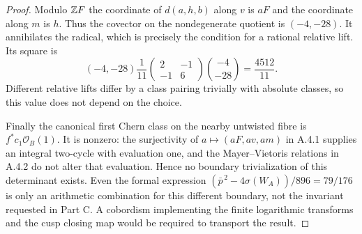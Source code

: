 \begin{proof}
Modulo $\mathbb Z F$ the coordinate of $d(a,h,b)$ along $v$ is $aF$
and the coordinate along $m$ is $h$. Thus the covector on the
nondegenerate quotient is $(-4,-28)$. It annihilates the radical,
which is precisely the condition for a rational relative lift.
Its square is
\[
 (-4,-28)\frac1{11}
 \begin{pmatrix}2&-1\\-1&6\end{pmatrix}
 \binom{-4}{-28}=\frac{4512}{11}.
\]
Different relative lifts differ by a class pairing trivially with
absolute classes, so this value does not depend on the choice.

Finally the canonical first Chern class on the nearby untwisted
fibre is $f^*c_1\mathcal O_B(1)$. It is nonzero: the surjectivity of
$a\mapsto(aF,av,am)$ in A.4.1 supplies an integral two-cycle with
evaluation one, and the Mayer--Vietoris relations in A.4.2 do not
alter that evaluation. Hence no boundary trivialization of this
determinant exists. Even the formal expression
$(\bar p^{\,2}-4\sigma(W_A))/896=79/176$ is only an arithmetic
combination for this different boundary, not the invariant requested
in Part C. A cobordism implementing the finite logarithmic transforms
and the cusp closing map would be required to transport the result.
\end{proof}
